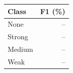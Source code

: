 \begin{tabular}{lr}
\toprule
Class & F1 (\%) \\
\midrule
None & -- \\
Strong & -- \\
Medium & -- \\
Weak & -- \\
\bottomrule
\end{tabular}
